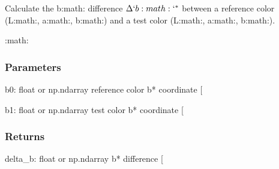 \documentclass[letterpaper,10pt,english]{sphinxmanual}
\begin{document}
\begin{fulllineitems}
\label{\detokenize{07_colors:skinoptics.colors.Delta_b}}
\pysigstartsignatures
{}
\pysigstopsignatures
\sphinxAtStartPar
Calculate the b:math:\sphinxtitleref{\textasciicircum{}*} difference \(\Delta`b:math:`^*\) between
a reference color (L:math:, a:math:, b:math:) and
a test color (L:math:, a:math:, b:math:).

\sphinxAtStartPar
:math:


\subsubsection{Parameters}
\label{\detokenize{07_colors:id5}}
\sphinxAtStartPar
b0: float or np.ndarray
reference color b* coordinate {[}\sphinxhyphen{}{]}

\sphinxAtStartPar
b1: float or np.ndarray
test color b* coordinate {[}\sphinxhyphen{}{]}


\subsubsection{Returns}
\label{\detokenize{07_colors:id6}}
\sphinxAtStartPar
delta\_b: float or np.ndarray
b* difference {[}\sphinxhyphen{}{]}

\end{fulllineitems}

\end{document}
